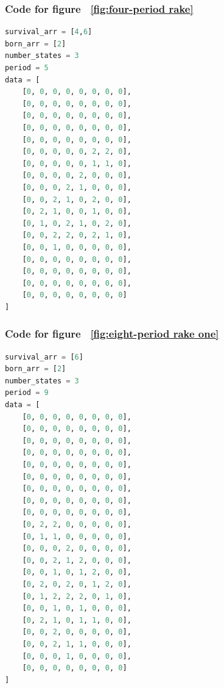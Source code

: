 \documentclass[12pt]{article}
\numberwithin{figure}{section} %
\begin{document}
\subsubsection{Code for figure ~\ref{fig:four-period rake}}
\label{subsubsection:four-period rake}
\begin{lstlisting}[language = Python]
survival_arr = [4,6]
born_arr = [2]
number_states = 3
period = 5
data = [
    [0, 0, 0, 0, 0, 0, 0, 0],
    [0, 0, 0, 0, 0, 0, 0, 0],
    [0, 0, 0, 0, 0, 0, 0, 0],
    [0, 0, 0, 0, 0, 0, 0, 0],
    [0, 0, 0, 0, 0, 0, 0, 0],
    [0, 0, 0, 0, 0, 2, 2, 0],
    [0, 0, 0, 0, 0, 1, 1, 0],
    [0, 0, 0, 0, 2, 0, 0, 0],
    [0, 0, 0, 2, 1, 0, 0, 0],
    [0, 0, 2, 1, 0, 2, 0, 0],
    [0, 2, 1, 0, 0, 1, 0, 0],
    [0, 1, 0, 2, 1, 0, 2, 0],
    [0, 0, 2, 2, 0, 2, 1, 0],
    [0, 0, 1, 0, 0, 0, 0, 0],
    [0, 0, 0, 0, 0, 0, 0, 0],
    [0, 0, 0, 0, 0, 0, 0, 0],
    [0, 0, 0, 0, 0, 0, 0, 0],
    [0, 0, 0, 0, 0, 0, 0, 0]
]
\end{lstlisting}
\subsubsection{Code for figure ~\ref{fig:eight-period rake one}}
\label{subsubsection:eight-period rake one}
\begin{lstlisting}[language = Python]
survival_arr = [6]
born_arr = [2]
number_states = 3
period = 9
data = [
    [0, 0, 0, 0, 0, 0, 0, 0],
    [0, 0, 0, 0, 0, 0, 0, 0],
    [0, 0, 0, 0, 0, 0, 0, 0],
    [0, 0, 0, 0, 0, 0, 0, 0],
    [0, 0, 0, 0, 0, 0, 0, 0],
    [0, 0, 0, 0, 0, 0, 0, 0],
    [0, 0, 0, 0, 0, 0, 0, 0],
    [0, 0, 0, 0, 0, 0, 0, 0],
    [0, 0, 0, 0, 0, 0, 0, 0],
    [0, 2, 2, 0, 0, 0, 0, 0],
    [0, 1, 1, 0, 0, 0, 0, 0],
    [0, 0, 0, 2, 0, 0, 0, 0],
    [0, 0, 2, 1, 2, 0, 0, 0],
    [0, 0, 1, 0, 1, 2, 0, 0],
    [0, 2, 0, 2, 0, 1, 2, 0],
    [0, 1, 2, 2, 2, 0, 1, 0],
    [0, 0, 1, 0, 1, 0, 0, 0],
    [0, 2, 1, 0, 1, 1, 0, 0],
    [0, 0, 2, 0, 0, 0, 0, 0],
    [0, 0, 2, 1, 1, 0, 0, 0],
    [0, 0, 0, 1, 0, 0, 0, 0],
    [0, 0, 0, 0, 0, 0, 0, 0]
]
\end{lstlisting}
\end{document}
